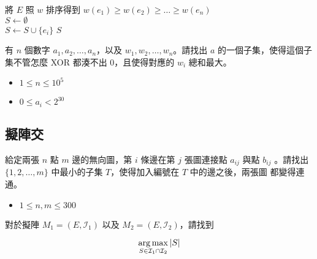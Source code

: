 \documentclass[standalone]{beamer}
\begin{document}
\begin{frame}{}
  \begin{algorithm}[H]

     {
      將 $E$ 照 $w$ 排序得到 $w(e_1) \geq w(e_2) \geq \ldots \geq w(e_n)$ \\
    }
     {
      $S \gets \emptyset$ \\
       {
         {
          $S \gets S \cup \{e_i\}$
        }
      }
    }
     {
      \Return $S$
    }
  \end{algorithm}
\end{frame}

\begin{frame}{}
  \begin{problem}
    有 $n$ 個數字 $a_1, a_2, \ldots, a_n$，以及 $w_1, w_2, \ldots, w_n$。請找出 $a$
    的一個子集，使得這個子集不管怎麼 XOR 都湊不出 $0$，且使得對應的 $w_i$ 總和最大。

    \begin{itemize}
      \item $1 \leq n \leq 10^5$
      \item $0 \leq a_i < 2^{30}$
    \end{itemize}
  \end{problem}
\end{frame}

\subsection{擬陣交}

\begin{frame}{}
   {
    \begin{problem}
      給定兩張 $n$ 點 $m$ 邊的無向圖，第 $i$ 條邊在第 $j$ 張圖連接點 $a_{ij}$ 與點 $b_{ij}$
    。請找出 $\{1, 2, \ldots, m\}$ 中最小的子集 $T$，使得加入編號在 $T$ 中的邊之後，兩張圖
      都變得連通。

      \begin{itemize}
        \item $1 \leq n, m \leq 300$
      \end{itemize}
    \end{problem}
  }
   {
    \begin{definition}
      對於擬陣 $M_1 = (E, \mathcal{I}_1)$ 以及 $M_2 = (E, \mathcal{I}_2)$，請找到

      \[ \operatorname*{arg\,max}_{S \in \mathcal{I}_1 \cap \mathcal{I}_2}|S| \]
    \end{definition}
  }
\end{frame}
\end{document}
